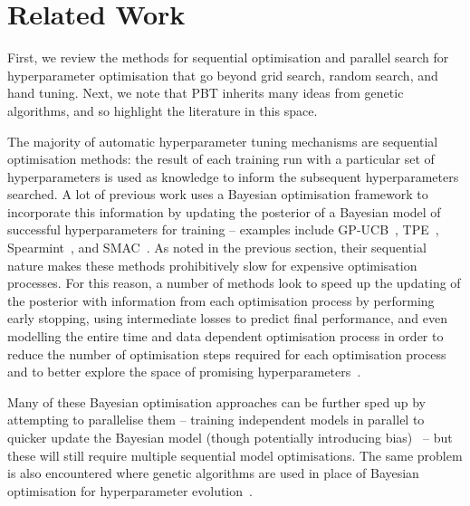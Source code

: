 \documentclass{article} %
\begin{document}


\section{Related Work}\label{sec:related}

First, we review the methods for sequential optimisation and parallel search for hyperparameter optimisation that go beyond grid search, random search, and hand tuning. Next, we note that PBT inherits many ideas from genetic algorithms, and so highlight the literature in this space.

The majority of automatic hyperparameter tuning mechanisms are sequential optimisation methods: the result of each training run with a particular set of hyperparameters is used as knowledge to inform the subsequent hyperparameters searched. A lot of previous work uses a Bayesian optimisation framework to incorporate this information by updating the posterior of a Bayesian model of successful hyperparameters for training -- examples include GP-UCB~\citep{srinivas2009gaussian}, TPE~\citep{bergstra2011algorithms}, Spearmint~\citep{snoek2012practical}, and SMAC~\citep{hutter2011sequential}. As noted in the previous section, their sequential nature makes these methods prohibitively slow for expensive optimisation processes. For this reason, a number of methods look to speed up the updating of the posterior with information from each optimisation process by performing early stopping, using intermediate losses to predict final performance, and even modelling the entire time and data dependent optimisation process in order to reduce the number of optimisation steps required for each optimisation process and to better explore the space of promising hyperparameters~\citep{gyorgy2011efficient,agarwal2011oracle,sabharwal2016selecting,swersky2013multi,swersky2014freeze,domhan2015speeding,klein2016fast,snoek2015scalable,springenberg2016bayesian}. 

Many of these Bayesian optimisation approaches can be further sped up by attempting to parallelise them -- training independent models in parallel to quicker update the Bayesian model (though potentially introducing bias)~\citep{shah2015parallel,gonzalez2016batch,wu2016parallel,rasley2017hyperdrive,golovin2017google} -- but these will still require multiple sequential model optimisations. The same problem is also encountered where genetic algorithms are used in place of Bayesian optimisation for hyperparameter evolution~\citep{young2015optimizing}.
\end{document}
